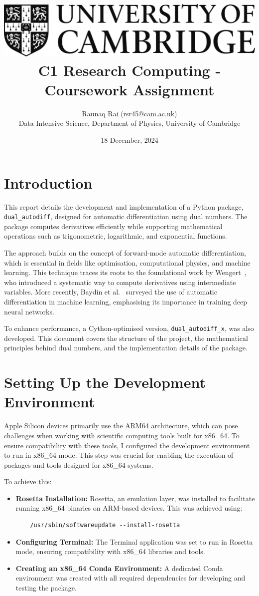 \documentclass[a4paper,12pt]{article}
\title{
    \includegraphics[scale=0.4]{Cam_logo_bw.png}\\
    \vspace{0.5cm}
    C1 Research Computing - Coursework Assignment
}
\author{Raunaq Rai (rsr45@cam.ac.uk)\\
    Data Intensive Science, Department of Physics, University of Cambridge
}
\date{18 December, 2024}
\begin{document}
\maketitle

\section{Introduction}
This report details the development and implementation of a Python package, \texttt{dual\_autodiff}, designed for automatic differentiation using dual numbers. The package computes derivatives efficiently while supporting mathematical operations such as trigonometric, logarithmic, and exponential functions.

The approach builds on the concept of forward-mode automatic differentiation, which is essential in fields like optimisation, computational physics, and machine learning. This technique traces its roots to the foundational work by Wengert~\cite{wengert1964automatic}, who introduced a systematic way to compute derivatives using intermediate variables. More recently, Baydin et al.~\cite{baydin2018automatic} surveyed the use of automatic differentiation in machine learning, emphasising its importance in training deep neural networks.

To enhance performance, a Cython-optimised version, \texttt{dual\_autodiff\_x}, was also developed. This document covers the structure of the project, the mathematical principles behind dual numbers, and the implementation details of the package.

\section{Setting Up the Development Environment}

Apple Silicon devices primarily use the ARM64 architecture, which can pose challenges when working with scientific computing tools built for x86\_64. To ensure compatibility with these tools, I configured the development environment to run in x86\_64 mode. This step was crucial for enabling the execution of packages and tools designed for x86\_64 systems.

To achieve this:
\begin{itemize}
    \item \textbf{Rosetta Installation:} Rosetta, an emulation layer, was installed to facilitate running x86\_64 binaries on ARM-based devices. This was achieved using:
    \begin{verbatim}
    /usr/sbin/softwareupdate --install-rosetta
    \end{verbatim}
    \item \textbf{Configuring Terminal:} The Terminal application was set to run in Rosetta mode, ensuring compatibility with x86\_64 libraries and tools.
    \item \textbf{Creating an x86\_64 Conda Environment:} A dedicated Conda environment was created with all required dependencies for developing and testing the package.
\end{itemize}
\end{document}
